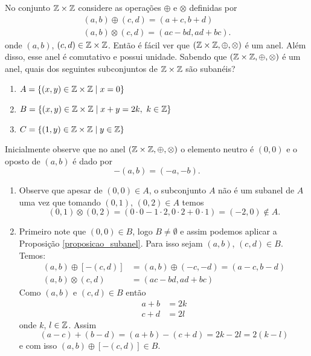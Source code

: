 \begin{exemplo}
    No conjunto $\mathbb{Z} \times \mathbb{Z}$ considere as operações $\oplus$ e $\otimes$ definidas por
    \begin{align*}
        (a, b) \oplus (c, d) = (a + c, b + d)\\
        (a ,b) \otimes (c, d) = (ac - bd, ad + bc).
    \end{align*}
    onde $(a, b)$, $(c, d) \in \mathbb{Z} \times \mathbb{Z}$. Então é fácil ver que $(\mathbb{Z} \times \mathbb{Z}, \oplus, \otimes)$ é um anel. Além disso, esse anel é comutativo e possui unidade. Sabendo que
    $(\mathbb{Z} \times \mathbb{Z}, \oplus, \otimes)$ é um anel, quais dos seguintes subconjuntos de $\mathbb{Z} \times \mathbb{Z}$ s\~ao suban\'eis?
    \begin{enumerate}[label=({\alph*})]
        \item $A = \{(x, y) \in \mathbb{Z} \times \mathbb{Z} \mid x = 0\}$

        \item $B = \{(x, y) \in \mathbb{Z} \times \mathbb{Z} \mid x + y = 2k,\ k \in \mathbb{Z}\}$

        \item $C =  \{(1, y) \in \mathbb{Z} \times \mathbb{Z} \mid y \in \mathbb{Z}\}$
    \end{enumerate}
    \begin{solucao}
        Inicialmente observe que no anel $(\mathbb{Z} \times \mathbb{Z}, \oplus, \otimes)$ o elemento neutro é $(0,0)$ e o oposto de $(a, b)$ é dado por
        \[
            -(a, b) = (-a, -b).
        \]
        \begin{enumerate}[label=({\alph*})]
            \item Observe que apesar de $(0, 0) \in A$, o subconjunto $A$ não é um subanel de $A$ uma vez que tomando $(0, 1)$, $(0, 2) \in A$ temos
                \[
                    (0, 1) \otimes (0, 2) = (0\cdot 0 - 1\cdot 2, 0\cdot 2 + 0\cdot 1) = (-2, 0) \notin A.
                \]

            \item Primeiro note que $(0, 0) \in B$, logo $B \ne \emptyset$ e assim podemos aplicar a Proposição \ref{proposicao_subanel}. Para isso sejam $(a, b)$, $(c, d) \in B$.
                Temos:
                \begin{align*}
                    (a, b) \oplus [-(c, d)] &= (a, b) \oplus (-c, -d) = (a - c, b - d)\\
                    (a, b) \otimes (c, d) &= (ac - bd, ad + bc)
                \end{align*}
                Como $(a, b)$ e $(c, d) \in B$ então
                \begin{align}
                    a + b &= 2k\label{primeira_condicao}\\
                    c + d &= 2l\label{segunda_condicao}
                \end{align}
                onde $k$, $l \in \mathbb{Z}$. Assim
                \[
                    (a - c) + (b - d) = (a + b) - (c + d) = 2k - 2l = 2(k - l)
                \]
                e com isso $(a, b) \oplus [-(c, d)] \in B$.


\end{enumerate}
\end{solucao}
\end{exemplo}
